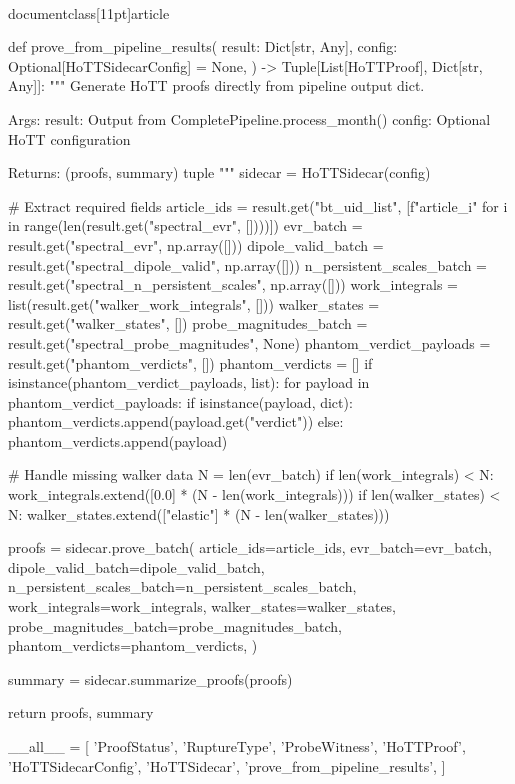 \\documentclass[11pt]{article}
\begin{document}
\begin{CodeBlock}
def prove_from_pipeline_results(
    result: Dict[str, Any],
    config: Optional[HoTTSidecarConfig] = None,
) -> Tuple[List[HoTTProof], Dict[str, Any]]:
    """
    Generate HoTT proofs directly from pipeline output dict.

    Args:
        result: Output from CompletePipeline.process_month()
        config: Optional HoTT configuration

    Returns:
        (proofs, summary) tuple
    """
    sidecar = HoTTSidecar(config)

    # Extract required fields
    article_ids = result.get("bt_uid_list", [f"article_{i}" for i in range(len(result.get("spectral_evr", [])))])
    evr_batch = result.get("spectral_evr", np.array([]))
    dipole_valid_batch = result.get("spectral_dipole_valid", np.array([]))
    n_persistent_scales_batch = result.get("spectral_n_persistent_scales", np.array([]))
    work_integrals = list(result.get("walker_work_integrals", []))
    walker_states = result.get("walker_states", [])
    probe_magnitudes_batch = result.get("spectral_probe_magnitudes", None)
    phantom_verdict_payloads = result.get("phantom_verdicts", [])
    phantom_verdicts = []
    if isinstance(phantom_verdict_payloads, list):
        for payload in phantom_verdict_payloads:
            if isinstance(payload, dict):
                phantom_verdicts.append(payload.get("verdict"))
            else:
                phantom_verdicts.append(payload)

    # Handle missing walker data
    N = len(evr_batch)
    if len(work_integrals) < N:
        work_integrals.extend([0.0] * (N - len(work_integrals)))
    if len(walker_states) < N:
        walker_states.extend(["elastic"] * (N - len(walker_states)))

    proofs = sidecar.prove_batch(
        article_ids=article_ids,
        evr_batch=evr_batch,
        dipole_valid_batch=dipole_valid_batch,
        n_persistent_scales_batch=n_persistent_scales_batch,
        work_integrals=work_integrals,
        walker_states=walker_states,
        probe_magnitudes_batch=probe_magnitudes_batch,
        phantom_verdicts=phantom_verdicts,
    )

    summary = sidecar.summarize_proofs(proofs)

    return proofs, summary


__all__ = [
    'ProofStatus',
    'RuptureType',
    'ProbeWitness',
    'HoTTProof',
    'HoTTSidecarConfig',
    'HoTTSidecar',
    'prove_from_pipeline_results',
]

\end{CodeBlock}
\end{document}

